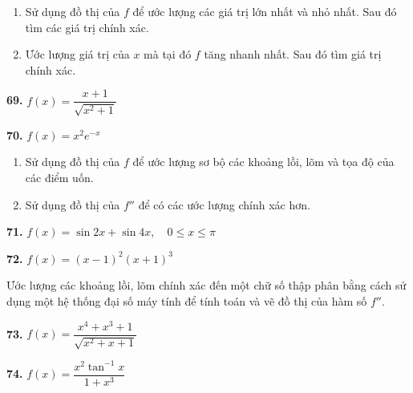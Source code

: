 \begin{minipage}[t]{0.485\textwidth}
\exerciseline

\calcicon{}
\begin{enumerate}[label=(\alph*), itemsep=0.5pt, topsep=1.5pt, parsep=0pt, leftmargin=1.4em]
  \item Sử dụng đồ thị của $f$ để ước lượng các giá trị lớn nhất và nhỏ nhất. Sau đó tìm các giá trị chính xác.
  \item Ước lượng giá trị của $x$ mà tại đó $f$ tăng nhanh nhất. Sau đó tìm giá trị chính xác.
\end{enumerate}

\vspace{0.25em}
\begin{minipage}[t]{0.48\linewidth}
  \textbf{69.} $f(x) = \dfrac{x + 1}{\sqrt{x^2 + 1}}$
\end{minipage}\hfill
\begin{minipage}[t]{0.50\linewidth}
  \textbf{70.} $f(x) = x^2 e^{-x}$
\end{minipage}

\exerciseline

\calcicon{}
\begin{enumerate}[label=(\alph*), itemsep=0.5pt, topsep=1.5pt, parsep=0pt, leftmargin=1.4em]
  \item Sử dụng đồ thị của $f$ để ước lượng sơ bộ các khoảng lồi, lõm và tọa độ của các điểm uốn.
  \item Sử dụng đồ thị của $f''$ để có các ước lượng chính xác hơn.
\end{enumerate}

\vspace{0.25em}
\noindent\textbf{71.} $f(x) = \sin 2x + \sin 4x, \quad 0 \le x \le \pi$

\vspace{0.25em}
\noindent\textbf{72.} $f(x) = (x - 1)^2(x + 1)^3$

\exerciseline

\casicon{}\hspace{0.5em}Ước lượng các khoảng lồi, lõm chính xác đến một chữ số thập phân bằng cách sử dụng một hệ thống đại số máy tính để tính toán và vẽ đồ thị của hàm số $f''$.

\vspace{0.35em}
\begin{minipage}[t]{0.50\linewidth}
  \textbf{73.} $f(x) = \dfrac{x^4 + x^3 + 1}{\sqrt{x^2 + x + 1}}$
\end{minipage}\hfill
\begin{minipage}[t]{0.48\linewidth}
  \textbf{74.} $f(x) = \dfrac{x^2 \tan^{-1}x}{1 + x^3}$
\end{minipage}


\end{minipage}

